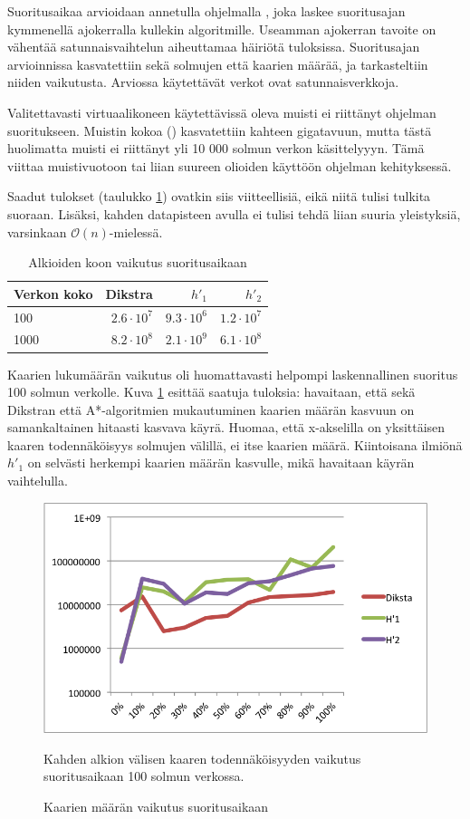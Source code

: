 \documentclass[10pt,a4paper]{article}
\begin{document}
Suoritusaikaa arvioidaan annetulla ohjelmalla \cite[Liite~1]{aalto}, joka laskee suoritusajan kymmenellä ajokerralla kullekin algoritmille. Useamman ajokerran tavoite on vähentää satunnaisvaihtelun aiheuttamaa häiriötä tuloksissa. Suoritusajan arvioinnissa kasvatettiin sekä solmujen että kaarien määrää, ja tarkasteltiin niiden vaikutusta. Arviossa käytettävät verkot ovat satunnaisverkkoja.

Valitettavasti virtuaalikoneen käytettävissä oleva muisti ei riittänyt ohjelman suoritukseen. Muistin kokoa () kasvatettiin kahteen gigatavuun, mutta tästä huolimatta muisti ei riittänyt yli 10 000 solmun verkon käsittelyyyn. Tämä viittaa muistivuotoon tai liian suureen olioiden käyttöön ohjelman kehityksessä.

Saadut tulokset (taulukko \ref{koko_suoritusaika}) ovatkin siis viitteellisiä, eikä niitä tulisi tulkita suoraan. Lisäksi, kahden datapisteen avulla ei tulisi tehdä liian suuria yleistyksiä, varsinkaan $\mathcal{O}(n)$-mielessä.

\begin{table}
\begin{tabular}{l|r|r|r}
Verkon koko & Dikstra & $h'_1$ & $h'_2$ \\ 
\hline 
100  & $2.6 \cdot 10^7 $ & $9.3 \cdot 10^6 $ & $ 1.2 \cdot 10^7 $ \\ 
1000 & $8.2 \cdot 10^8 $ & $2.1 \cdot 10^9 $ & $ 6.1 \cdot 10^8 $ \\
\end{tabular} 
\caption{Alkioiden koon vaikutus suoritusaikaan}
\label{koko_suoritusaika}
\end{table}

Kaarien lukumäärän vaikutus oli huomattavasti helpompi laskennallinen suoritus 100 solmun verkolle. Kuva \ref{kaaret_suoritusaika} esittää saatuja tuloksia: havaitaan, että sekä Dikstran että A*-algoritmien mukautuminen kaarien määrän kasvuun on samankaltainen hitaasti kasvava käyrä. Huomaa, että x-akselilla on yksittäisen kaaren todennäköisyys solmujen välillä, ei itse kaarien määrä. Kiintoisana ilmiönä $h'_1$ on selvästi herkempi kaarien määrän kasvulle, mikä havaitaan käyrän vaihtelulla.

\begin{figure}
\includegraphics[scale=.6]{kaarien_maara.png} 
\caption{Kaarien määrän vaikutus suoritusaikaan}
\label{kaaret_suoritusaika}
Kahden alkion välisen kaaren todennäköisyyden vaikutus suoritusaikaan 100 solmun verkossa.
\end{figure}
\end{document}
